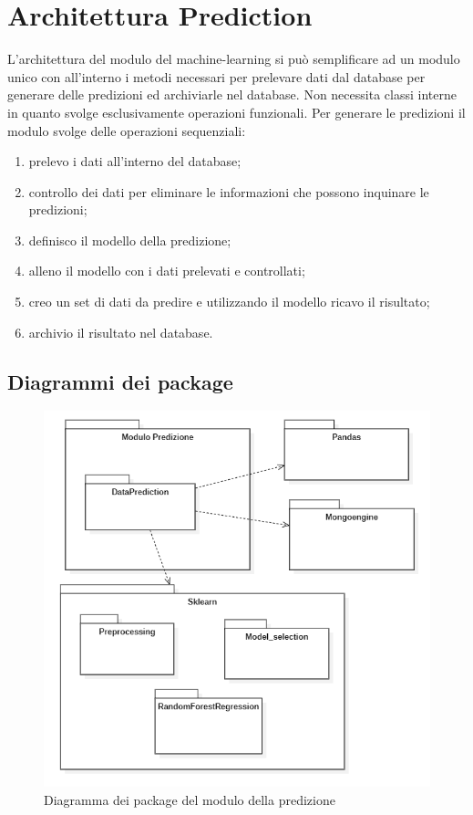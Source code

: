 \section{Architettura Prediction}\label{ArchitetturaDelProdottoPrediction}
L'architettura del modulo del machine-learning si può semplificare ad un modulo unico con all'interno i metodi necessari per prelevare dati dal database per generare delle predizioni ed archiviarle nel database.
Non necessita classi interne in quanto svolge esclusivamente operazioni funzionali. Per generare le predizioni il modulo svolge delle operazioni sequenziali:
\begin{enumerate}
	\item prelevo i dati all'interno del database;
	\item controllo dei dati per eliminare le informazioni che possono inquinare le predizioni;
	\item definisco il modello della predizione;
	\item alleno il modello con i dati prelevati e controllati;
	\item creo un set di dati da predire e utilizzando il modello ricavo il risultato;
	\item archivio il risultato nel database.
\end{enumerate}
\subsection{Diagrammi dei package}
\begin{center}
	\begin{figure}[H]
		\includegraphics{../immagini/diag_PB/diag_pack_pred.png}
		\caption{Diagramma dei package del modulo della predizione}
	\end{figure}
\end{center}

